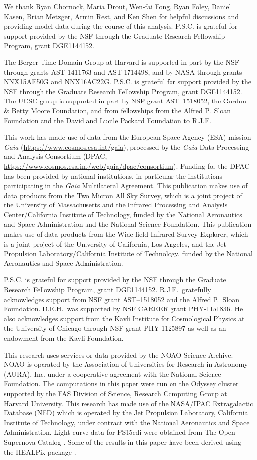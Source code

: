 We thank Ryan Chornock, Maria Drout, Wen-fai Fong, Ryan Foley, Daniel Kasen, Brian Metzger, Armin Rest, and Ken Shen for helpful discussions and providing model data during the course of this analysis. P.S.C. is grateful for support provided by the NSF through the Graduate Research Fellowship Program, grant DGE1144152.

The Berger Time-Domain Group at Harvard is supported in part by the NSF through grants AST-1411763 and AST-1714498, and by NASA through grants NNX15AE50G and NNX16AC22G. P.S.C. is grateful for support provided by the NSF
through the Graduate Research Fellowship Program, grant DGE1144152. The UCSC group is supported in part by NSF grant AST--1518052, the Gordon \& Betty Moore Foundation, and from fellowships from the Alfred P.\ Sloan Foundation and the David and Lucile Packard Foundation to R.J.F.

This work has made use of data from the European Space Agency (ESA)
mission {\it Gaia} (\url{https://www.cosmos.esa.int/gaia}), processed by
the {\it Gaia} Data Processing and Analysis Consortium (DPAC,
\url{https://www.cosmos.esa.int/web/gaia/dpac/consortium}). Funding
for the DPAC has been provided by national institutions, in particular
the institutions participating in the {\it Gaia} Multilateral Agreement.
This publication makes use of data products from the Two Micron All Sky Survey,
which is a joint project of the University of Massachusetts and the Infrared Processing
and Analysis Center/California Institute of Technology, funded by the National Aeronautics
and Space Administration and the National Science Foundation. This publication makes use
of data products from the Wide-field Infrared Survey Explorer, which is a joint project of the
University of California, Los Angeles, and the Jet Propulsion Laboratory/California Institute of
Technology, funded by the National Aeronautics and Space Administration.

P.S.C. is grateful for support provided by the NSF
through the Graduate Research Fellowship Program, grant DGE1144152.
R.J.F.\ gratefully acknowledges support from NSF grant AST--1518052 and
the Alfred P.\ Sloan Foundation. D.E.H.\ was supported by NSF CAREER grant
PHY-1151836. He also acknowledges support from the Kavli Institute for
Cosmological Physics at the University of Chicago through NSF grant
PHY-1125897 as well as an endowment from the Kavli Foundation.

This research uses services or data provided by the NOAO Science
Archive. NOAO is operated by the Association of Universities for
Research in Astronomy (AURA), Inc. under a cooperative agreement with
the National Science Foundation. The computations in this paper were
run on the Odyssey cluster supported by the FAS Division of Science,
Research Computing Group at Harvard University. This research has made
use of the NASA/IPAC Extragalactic Database (NED) which is operated by
the Jet Propulsion Laboratory, California Institute of Technology,
under contract with the National Aeronautics and Space Administration.
Light curve data for PS15cdi were obtained from The Open Supernova
Catalog \citep{Guillochon+17}. Some of the results in this paper have been
derived using the HEALPix package \citep{Gorski+05}.

